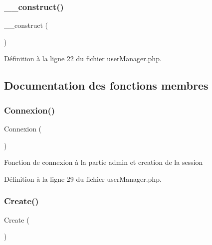 \subsubsection{\texorpdfstring{\+\_\+\+\_\+construct()}{\_\_construct()}}
{\footnotesize\ttfamily \+\_\+\+\_\+construct (\begin{DoxyParamCaption}{ }\end{DoxyParamCaption})}



Définition à la ligne 22 du fichier user\+Manager.\+php.



\subsection{Documentation des fonctions membres}
\mbox{\label{class_src_1_1_managers_1_1user_manager_a00fdd5c0ca353b468ea33fb246c28d90}} 
\subsubsection{\texorpdfstring{Connexion()}{Connexion()}}
{\footnotesize\ttfamily Connexion (\begin{DoxyParamCaption}{ }\end{DoxyParamCaption})}

Fonction de connexion à la partie admin et creation de la session 

Définition à la ligne 29 du fichier user\+Manager.\+php.

\mbox{\label{class_src_1_1_managers_1_1user_manager_ad01f71fa0ecc039494e3c282864298c3}} 
\subsubsection{\texorpdfstring{Create()}{Create()}}
{\footnotesize\ttfamily Create (\begin{DoxyParamCaption}{ }\end{DoxyParamCaption})}

